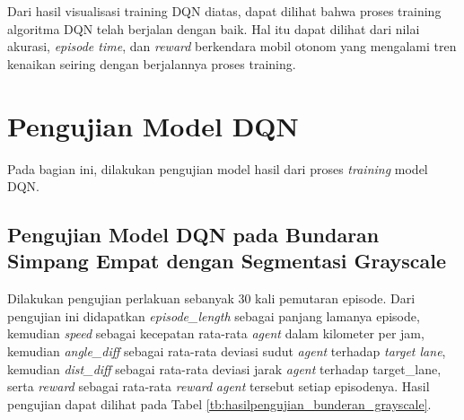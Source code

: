 Dari hasil visualisasi training DQN diatas, dapat dilihat bahwa proses training algoritma DQN telah berjalan dengan baik. Hal itu dapat dilihat dari nilai akurasi, \textit{episode time}, dan \textit{reward} berkendara mobil otonom yang mengalami tren kenaikan seiring dengan berjalannya proses training.

\fi

\section{Pengujian Model DQN}
\label{sec:pengujian_model_dqn}

Pada bagian ini, dilakukan pengujian model hasil dari proses \textit{training} model DQN.

\subsection{Pengujian Model DQN pada Bundaran Simpang Empat dengan Segmentasi Grayscale}
\label{sec:pengujian_dqn_bundaran_simpangempat_segmentasi_grayscale}

Dilakukan pengujian perlakuan sebanyak 30 kali pemutaran episode. Dari pengujian ini didapatkan \textit{episode\_length }sebagai panjang lamanya episode, kemudian \textit{speed} sebagai kecepatan rata-rata \textit{agent} dalam kilometer per jam, kemudian \textit{angle\_diff} sebagai rata-rata deviasi sudut \textit{agent} terhadap \textit{target lane}, kemudian \textit{dist\_diff} sebagai rata-rata deviasi jarak \textit{agent} terhadap target\_lane, serta \textit{reward} sebagai rata-rata \textit{reward }\textit{agent} tersebut setiap episodenya. Hasil pengujian dapat dilihat pada Tabel \ref{tb:hasilpengujian_bunderan_grayscale}.

